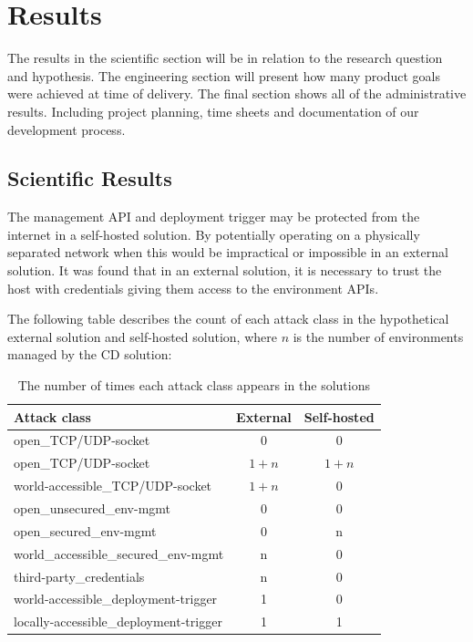 \chapter{Results}
\label{chap:results}
The results in the scientific section will be in relation to the research question and hypothesis. The engineering section will present how many product goals were achieved at time of delivery. The final section shows all of the administrative results. Including project planning, time sheets and documentation of our development process.

\section{Scientific Results}
The management \acrshort{API} and deployment trigger may be protected from the internet in a self-hosted solution. By potentially operating on a physically separated network when this would be impractical or impossible in an external solution. It was found that in an external solution, it is necessary to trust the host with credentials giving them access to the environment \acrshort{API}s.


The following table describes the count of each attack class in the hypothetical external solution and self-hosted solution, where $n$ is the number of environments managed by the \acrshort{CD} solution:
\begin{table}[ht]
    \begin{tabularx}{\textwidth}{|X|c|c|}
        \hline
        \textbf{Attack class}                  & \textbf{External} & \textbf{Self-hosted}\\ \hline \hline
        open\_TCP/UDP-socket                   & 0 & 0        \\ \hline
        open\_TCP/UDP-socket                   & $1+n$ & $1+n$\\ \hline
        world-accessible\_TCP/UDP-socket       & $1+n$ & 0    \\ \hline
        open\_unsecured\_env-mgmt              & 0     & 0    \\ \hline
        open\_secured\_env-mgmt                & 0     & n    \\ \hline
        world\_accessible\_secured\_env-mgmt   & n     & 0    \\ \hline
        third-party\_credentials               & n     & 0    \\ \hline
        world-accessible\_deployment-trigger   & 1     & 0    \\ \hline
        locally-accessible\_deployment-trigger & 1     & 1    \\ \hline
    \end{tabularx}
    \caption{The number of times each attack class appears in the solutions}
    \label{tab:result1}
\end{table}

